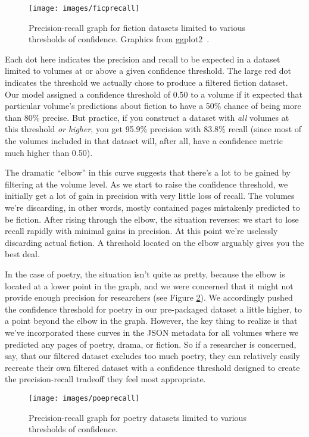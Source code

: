 \documentclass[paper=a4, fontsize=12pt]{scrartcl}
\numberwithin{equation}{section}		%
\numberwithin{figure}{section}			%
\numberwithin{table}{section}				%
\begin{document}
\begin{figure}[!h]
\centering
\texttt{[image: images/ficprecall]}
\caption{Precision-recall graph for fiction datasets limited to various thresholds of confidence. Graphics from ggplot2~\cite{ggplot}.}
\label{ficprecall}
\end{figure}

Each dot here indicates the precision and recall to be expected in a dataset limited to volumes at or above a given confidence threshold. The large red dot indicates the threshold we actually chose to produce a filtered fiction dataset. Our model assigned a confidence threshold of 0.50 to a volume if it expected that particular volume's predictions about fiction to have a 50\% chance of being more than 80\% precise. But practice, if you construct a dataset with \textit{all} volumes at this threshold \textit{or higher}, you get 95.9\% precision with 83.8\% recall (since most of the volumes included in that dataset will, after all, have a confidence metric much higher than 0.50).

The dramatic ``elbow'' in this curve suggests that there's a lot to be gained by filtering at the volume level. As we start to raise the confidence threshold, we initially get a lot of gain in precision with very little loss of recall. The volumes we're discarding, in other words, mostly contained pages mistakenly predicted to be fiction. After rising through the elbow, the situation reverses: we start to lose recall rapidly with minimal gains in precision. At this point we're uselessly discarding actual fiction. A threshold located on the elbow arguably gives you the best deal.

In the case of poetry, the situation isn't quite as pretty, because the elbow is located at a lower point in the graph, and we were concerned that it might not provide enough precision for researchers (see Figure \ref{poeprecall}). We accordingly pushed the confidence threshold for poetry in our pre-packaged dataset a little higher, to a point beyond the elbow in the graph. However, the key thing to realize is that we've incorporated these curves in the JSON metadata for all volumes where we predicted any pages of poetry, drama, or fiction. So if a researcher is concerned, say, that our filtered dataset excludes too much poetry, they can relatively easily recreate their own filtered dataset with a confidence threshold designed to create the precision-recall tradeoff they feel most appropriate.

\begin{figure}[!h]
\centering
\texttt{[image: images/poeprecall]}
\caption{Precision-recall graph for poetry datasets limited to various thresholds of confidence.}
\label{poeprecall}
\end{figure}
\end{document}
